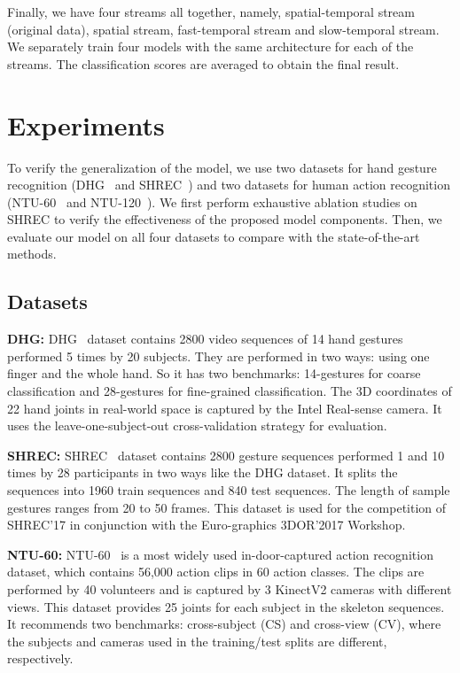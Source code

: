 \documentclass[runningheads]{llncs}
\begin{document}
Finally, we have four streams all together, namely, spatial-temporal stream (original data), spatial stream, fast-temporal stream and slow-temporal stream. 
We separately train four models with the same architecture for each of the streams. 
The classification scores are averaged to obtain the final result.



\section{Experiments}
To verify the generalization of the model, we use two datasets for hand gesture recognition (DHG~\cite{de_smedt_skeleton-based_2016} and SHREC~\cite{de_smedt_shrec17_2017}) and two datasets for human action recognition (NTU-60~\cite{shahroudy_ntu_2016} and NTU-120~\cite{liu_ntu_2019}). We first perform exhaustive ablation studies on SHREC to verify the effectiveness of the proposed model components. Then, we evaluate our model on all four datasets to compare with the state-of-the-art methods.

\subsection{Datasets}
\textbf{DHG:} DHG~\cite{de_smedt_skeleton-based_2016} dataset contains 2800 video sequences of 14 hand gestures performed 5 times by 20 subjects. They are performed in two ways: using one finger and the whole hand. So it has two benchmarks: 14-gestures for coarse classification and 28-gestures for fine-grained classification. The 3D coordinates of 22 hand joints in real-world space is captured by the Intel Real-sense camera. It uses the leave-one-subject-out cross-validation strategy for evaluation. 

\textbf{SHREC:} SHREC~\cite{de_smedt_shrec17_2017} dataset contains 2800 gesture sequences performed 1 and 10 times by 28 participants in two ways like the DHG dataset. It splits the sequences into 1960 train sequences and 840 test sequences. The length of sample gestures ranges from 20 to 50 frames. This dataset is used for the competition of SHREC'17 in conjunction with the Euro-graphics 3DOR'2017 Workshop. 

\textbf{NTU-60:} NTU-60~\cite{shahroudy_ntu_2016} is a most widely used in-door-captured action recognition dataset, which contains 56,000 action clips in 60 action classes. The clips are performed by 40 volunteers and is captured by 3 KinectV2 cameras with different views. This dataset provides 25 joints for each subject in the skeleton sequences. It recommends two benchmarks: cross-subject (CS) and cross-view (CV), where the subjects and cameras used in the training/test splits are different, respectively. 
\end{document}
